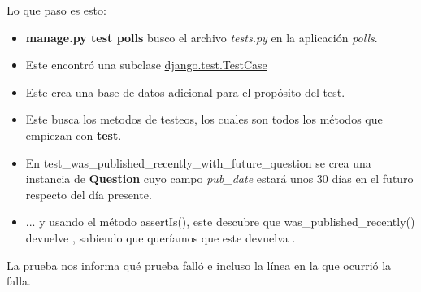 \documentclass[10pt]{article}
\begin{document}
Lo que paso es esto:
\begin{itemize}
\item \textbf{manage.py test polls} busco el archivo \textit{tests.py} en la aplicación \textit{polls}.

\item Este encontró una subclase {\href{https://docs.djangoproject.com/en/3.0/topics/testing/tools/\#django.test.TestCase}{\textcolor{B}{django.test.TestCase}}} 

\item Este crea una base de datos adicional para el propósito del test. 

\item Este busca los metodos de testeos, los cuales son todos los métodos que empiezan con \textbf{test}.

\item 
En \textcolor{G}{test\_was\_published\_recently\_with\_future\_question} se crea una instancia de \textbf{Question} cuyo campo \textit{pub\_date} estará unos 30 días en el futuro respecto del día presente. 

\item 
... y usando el método \textcolor{G}{assertIs()}, este descubre que \textcolor{G}{was\_published\_recently()} devuelve , sabiendo que queríamos que este devuelva . 
\end{itemize}

La prueba nos informa qué prueba falló e incluso la línea en la que ocurrió la falla.
\end{document}
